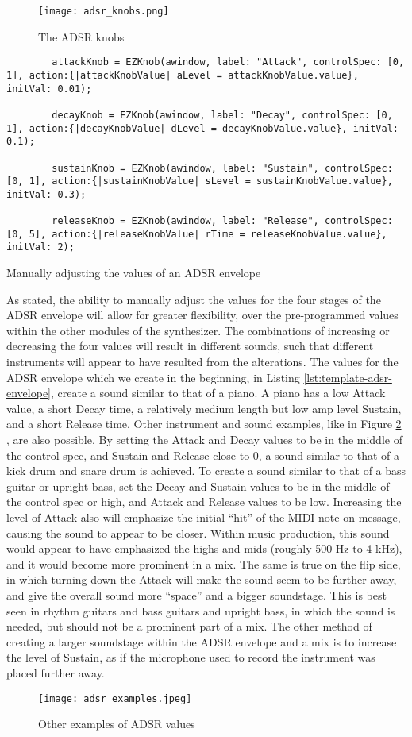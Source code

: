 \begin{figure}[h]
  \centering
  \texttt{[image: adsr\_knobs.png]}
  \caption{The ADSR knobs}
  \label{fig:adsr-knobs}
\end{figure}


\begin{listing}
	\begin{lstlisting}
		attackKnob = EZKnob(awindow, label: "Attack", controlSpec: [0, 1], action:{|attackKnobValue| aLevel = attackKnobValue.value}, initVal: 0.01);

		decayKnob = EZKnob(awindow, label: "Decay", controlSpec: [0, 1], action:{|decayKnobValue| dLevel = decayKnobValue.value}, initVal: 0.1);

		sustainKnob = EZKnob(awindow, label: "Sustain", controlSpec: [0, 1], action:{|sustainKnobValue| sLevel = sustainKnobValue.value}, initVal: 0.3);

		releaseKnob = EZKnob(awindow, label: "Release", controlSpec: [0, 5], action:{|releaseKnobValue| rTime = releaseKnobValue.value}, initVal: 2);
	\end{lstlisting}	
	\caption{Manually adjusting the values of an ADSR envelope}
	\label{lst:midi-adsr-manual}
\end{listing}

As stated, the ability to manually adjust the values for the four stages of the ADSR envelope will allow for greater flexibility, over the pre-programmed values within the other modules of the synthesizer. The combinations of increasing or decreasing the four values will result in different sounds, such that different instruments will appear to have resulted from the alterations. The values for the ADSR envelope which we create in the beginning, in Listing \ref{lst:template-adsr-envelope}, create a sound similar to that of a piano. A piano has a low Attack value, a short Decay time, a relatively medium length but low amp level Sustain, and a short Release time. Other instrument and sound examples, like in Figure \ref{fig:adsr-examples} \cite{Swisher_2019}, are also possible. By setting the Attack and Decay values to be in the middle of the control spec, and Sustain and Release close to 0, a sound similar to that of a kick drum and snare drum is achieved. To create a sound similar to that of a bass guitar or upright bass, set the Decay and Sustain values to be in the middle of the control spec or high, and Attack and Release values to be low. Increasing the level of Attack also will emphasize the initial ``hit'' of the MIDI note on message, causing the sound to appear to be closer. Within music production, this sound would appear to have emphasized the highs and mids (roughly 500 Hz to 4 kHz), and it would become more prominent in a mix. The same is true on the flip side, in which turning down the Attack will make the sound seem to be further away, and give the overall sound more ``space'' and a bigger soundstage. This is best seen in rhythm guitars and bass guitars and upright bass, in which the sound is needed, but should not be a prominent part of a mix. The other method of creating a larger soundstage within the ADSR envelope and a mix is to increase the level of Sustain, as if the microphone used to record the instrument was placed further away. 

\begin{figure}
  \centering
  \texttt{[image: adsr\_examples.jpeg]}
  \caption{Other examples of ADSR values} \cite{Swisher_2019}
  \label{fig:adsr-examples}
\end{figure}